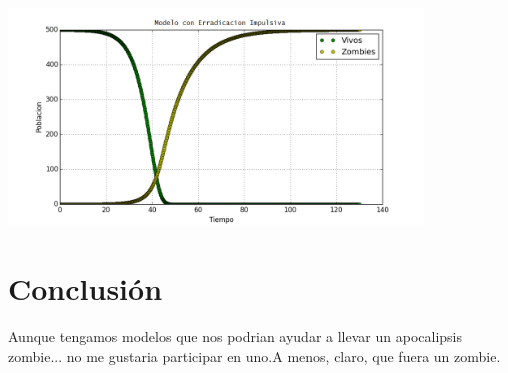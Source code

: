 \documentclass[a4paper]{article}
\begin{document}
\includegraphics[width=11cm]{erradicacion}

\section{Conclusión}
Aunque tengamos modelos que nos podrian ayudar a llevar un apocalipsis zombie... no me gustaria participar en uno.A menos, claro, que fuera un zombie.
\end{document}
